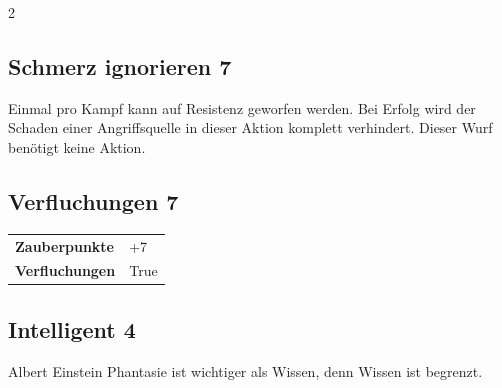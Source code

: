 \begin{multicols}{2}
\begin{tcolorbox}

\end{tcolorbox}

\begin{tcolorbox}
    \subsection*{Schmerz ignorieren \hfill \small{7 }}
    \tcblower
Einmal pro Kampf kann auf Resistenz geworfen werden. Bei Erfolg wird der Schaden einer Angriffsquelle in dieser Aktion komplett verhindert. Dieser Wurf benötigt keine Aktion.


\vspace{3mm}



\end{tcolorbox}

\begin{tcolorbox}
    \subsection*{Verfluchungen \hfill \small{7 }}
    \tcblower




\begin{tabular}{@{}ll@{}}
    \textbf{Zauberpunkte} & +7\\
    \textbf{Verfluchungen} & True\\
\end{tabular}


\end{tcolorbox}

\begin{tcolorbox}
    \subsection*{Intelligent \hfill \small{4 }}
    \tcblower


\begin{pquote}{Albert Einstein}
Phantasie ist wichtiger als Wissen, denn Wissen ist begrenzt.
\end{pquote}


\end{tcolorbox}
\end{multicols}
